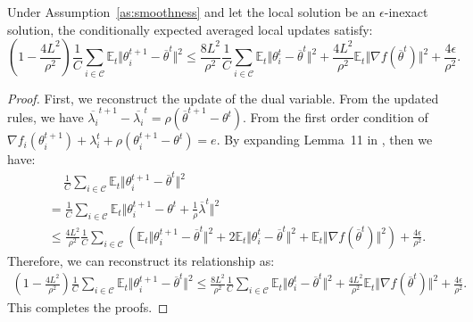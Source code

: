 \begin{lemma}
\label{R_t}
    Under Assumption~\ref{as:smoothness} and let the local solution be an $\epsilon$-inexact solution, the conditionally expected averaged local updates satisfy:
    \begin{equation}
        \left(1 - \frac{4L^2}{\rho^2}\right)\frac{1}{C}\sum_{i\in\mathcal{C}}\mathbb{E}_t\Vert\theta_i^{t+1} - \overline{\theta}^{t}\Vert^2 \leq \frac{8L^2}{\rho^2}\frac{1}{C}\sum_{i\in\mathcal{C}}\mathbb{E}_t\Vert \theta_i^{t} - \overline{\theta}^{t}\Vert^2 + \frac{4L^2}{\rho^2}\mathbb{E}_t\Vert\nabla f(\overline{\theta}^{t})\Vert^2 + \frac{4\epsilon}{\rho^2}.
    \end{equation}
\end{lemma}
\begin{proof}
    First, we reconstruct the update of the dual variable. From the updated rules, we have $\overline{\lambda_i}^{t+1} - \overline{\lambda_i}^{t} = \rho(\overline{\theta}^{t+1} - \theta^t)$. From the first order condition of $\nabla f_i(\theta_i^{t+1}) + \lambda_i^t + \rho(\theta_i^{t+1} - \theta^t) = e$. By expanding Lemma~11 in \citep{durmus2021federated}, then we have:
    \begin{align*}
        &\quad \ \frac{1}{C}\sum_{i\in\mathcal{C}}\mathbb{E}_t\Vert \theta_i^{t+1} - \overline{\theta}^{t}\Vert^2\\
        &= \frac{1}{C}\sum_{i\in\mathcal{C}}\mathbb{E}_t\Vert \theta_i^{t+1} - \theta^t + \frac{1}{\rho}\overline{\lambda}^t\Vert^2 \\
        &\leq \frac{4L^2}{\rho^2}\frac{1}{C}\sum_{i\in\mathcal{C}}\left(\mathbb{E}_t\Vert\theta_i^{t+1} - \overline{\theta}^{t}\Vert^2 + 2\mathbb{E}_t\Vert \theta_i^{t} - \overline{\theta}^{t}\Vert^2 + \mathbb{E}_t\Vert\nabla f(\overline{\theta}^{t})\Vert^2\right) + \frac{4\epsilon}{\rho^2}.
    \end{align*}
    Therefore, we can reconstruct its relationship as:
    \begin{align*}
        \left(1 - \frac{4L^2}{\rho^2}\right)\frac{1}{C}\sum_{i\in\mathcal{C}}\mathbb{E}_t\Vert\theta_i^{t+1} - \overline{\theta}^{t}\Vert^2 \leq \frac{8L^2}{\rho^2}\frac{1}{C}\sum_{i\in\mathcal{C}}\mathbb{E}_t\Vert \theta_i^{t} - \overline{\theta}^{t}\Vert^2 + \frac{4L^2}{\rho^2}\mathbb{E}_t\Vert\nabla f(\overline{\theta}^{t})\Vert^2 + \frac{4\epsilon}{\rho^2}.
    \end{align*}
    This completes the proofs.
\end{proof}

